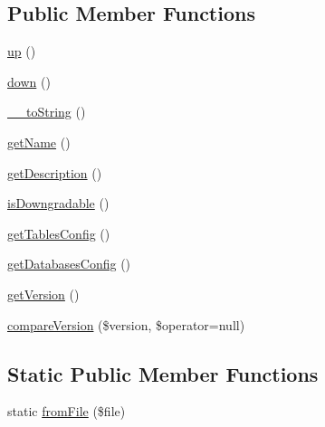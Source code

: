\subsection*{Public Member Functions}
\begin{DoxyCompactItemize}
\item 
\hyperlink{classZendDbSchema__Db__Migration__Change_a86704d3490f84843fc211d69519a3c45}{up} ()
\item 
\hyperlink{classZendDbSchema__Db__Migration__Change_a1f4e03bb7407c472f19ccef2eaa95c04}{down} ()
\item 
\hyperlink{classZendDbSchema__Db__Migration__Change_ab2d12c5db5ac9d0504df4627cbf681f0}{\-\_\-\-\_\-to\-String} ()
\item 
\hyperlink{classZendDbSchema__Db__Migration__Change_a3cd467163053caf7a3da8f23258c0546}{get\-Name} ()
\item 
\hyperlink{classZendDbSchema__Db__Migration__Change_acd9a6ab871cc3feb9f0ec89c3ddc9425}{get\-Description} ()
\item 
\hyperlink{classZendDbSchema__Db__Migration__Change_aeafd5d65ad6c164bb095f9c534ae3d2d}{is\-Downgradable} ()
\item 
\hyperlink{classZendDbSchema__Db__Migration__Change_a4415665402752a745bc97b5f6228a1b5}{get\-Tables\-Config} ()
\item 
\hyperlink{classZendDbSchema__Db__Migration__Change_ab859a88754ae761808fbf3ecb1e11160}{get\-Databases\-Config} ()
\item 
\hyperlink{classZendDbSchema__Db__Migration__Change_a924196733cc66d840a96a5faae311ed4}{get\-Version} ()
\item 
\hyperlink{classZendDbSchema__Db__Migration__Change_ac90aa7dd80e395fe3ba86d3f89ae5b7b}{compare\-Version} (\$version, \$operator=null)
\end{DoxyCompactItemize}
\subsection*{Static Public Member Functions}
\begin{DoxyCompactItemize}
\item 
static \hyperlink{classZendDbSchema__Db__Migration__Change_abd5253380521e63e91099a6ab3b89387}{from\-File} (\$file)
\end{DoxyCompactItemize}
